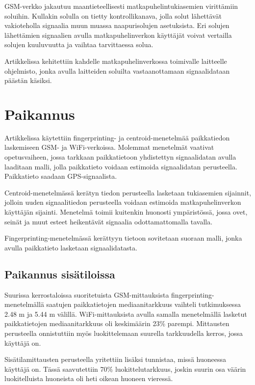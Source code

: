 \documentclass[a4paper]{scrartcl}
\begin{document}
GSM-verkko jakautuu maantieteellisesti matkapuhelintukiasemien virittämiin soluihin. Kullakin solulla on tietty
kontrollikanava, jolla solut lähettävät vakioteholla signaalia muun muassa naapurisolujen asetuksista. Eri solujen lähettämien signaalien avulla matkapuhelinverkon käyttäjät voivat
vertailla solujen kuuluvuutta ja vaihtaa tarvittaessa solua.

Artikkelissa kehitettiin kahdelle matkapuhelinverkossa toimivalle laitteelle
ohjelmisto, jonka avulla laitteiden soluilta vastaanottamaan signaalidataan päästän
käsiksi.

\section{Paikannus}

Artikkelissa käytettiin fingerprinting- ja centroid-menetelmää paikkatiedon laskemiseen GSM- ja WiFi-verkoissa. Molemmat menetelmät vaativat opetusvaiheen,
jossa tarkkaan paikkatietoon yhdistettyn signaalidatan avulla laaditaan malli, jolla paikkatieto voidaan estimoida signaalidatan perusteella. Paikkatieto saadaan GPS-signaalista.

Centroid-menetelmässä kerätyn tiedon perusteella lasketaan tukiasemien sijainnit,
jolloin uuden signaalitiedon perusteella voidaan estimoida matkapuhelinverkon
käyttäjän sijainti. Menetelmä toimii kuitenkin huonosti ympäristössä, jossa
ovet, seinät ja muut esteet heikentävät signaalia odottamattomalla tavalla.

Fingerprinting-menetelmässä kerättyyn tietoon sovitetaan suoraan malli, jonka
avulla paikkatieto lasketaan signaalidatasta.

\subsection{Paikannus sisätiloissa}

Suurissa kerrostaloissa suoritetuista GSM-mittauksista fingerprinting-menetelmällä saatujen paikkatietojen mediaanitarkkuus vaihteli tutkimuksessa 2.48 m ja 5.44 m 
välillä. WiFi-mittauksista avulla samalla menetelmällä lasketut paikkatietojen 
mediaanitarkkuus oli keskimäärin 23\% parempi. Mittausten perusteella onnistuttiin
myös luokittelemaan suurella tarkkuudella kerros, jossa käyttäjä on.

Sisätilamittausten perusteella yritettiin lisäksi tunnistaa, missä huoneessa
käyttäjä on. Tässä saavutettiin 70\% luokittelutarkkuus, joskin suurin osa
väärin luokitelluista huoneista oli heti oikean huoneen vieressä.
\end{document}
